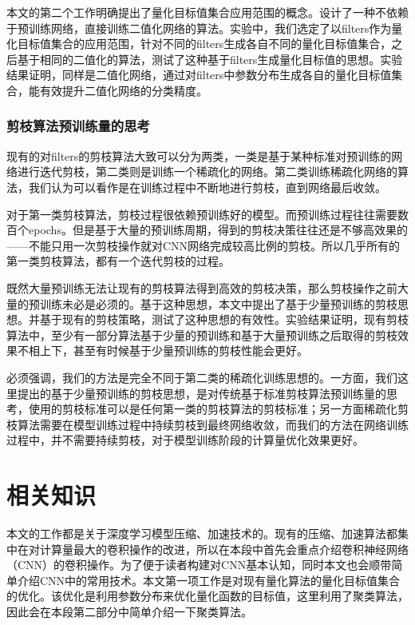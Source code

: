\documentclass[ pdftex, oneside, master]{NJUthesis}
\begin{document}
本文的第二个工作明确提出了量化目标值集合应用范围的概念。设计了一种不依赖于预训练网络，直接训练二值化网络的算法。实验中，我们选定了以filters作为量化目标值集合的应用范围，针对不同的filters生成各自不同的量化目标值集合，之后基于相同的二值化的算法，测试了这种基于filters生成量化目标值的思想。实验结果证明，同样是二值化网络，通过对filters中参数分布生成各自的量化目标值集合，能有效提升二值化网络的分类精度。

\subsection{剪枝算法预训练量的思考}

现有的对filters的剪枝算法大致可以分为两类，一类是基于某种标准对预训练的网络进行迭代剪枝，第二类则是训练一个稀疏化的网络。第二类训练稀疏化网络的算法，我们认为可以看作是在训练过程中不断地进行剪枝，直到网络最后收敛。

对于第一类剪枝算法，剪枝过程很依赖预训练好的模型。而预训练过程往往需要数百个epochs。但是基于大量的预训练周期，得到的剪枝决策往往还是不够高效果的——不能只用一次剪枝操作就对CNN网络完成较高比例的剪枝。所以几乎所有的第一类剪枝算法，都有一个迭代剪枝的过程。

既然大量预训练无法让现有的剪枝算法得到高效的剪枝决策，那么剪枝操作之前大量的预训练未必是必须的。基于这种思想，本文中提出了基于少量预训练的剪枝思想。并基于现有的剪枝策略，测试了这种思想的有效性。实验结果证明，现有剪枝算法中，至少有一部分算法基于少量的预训练和基于大量预训练之后取得的剪枝效果不相上下，甚至有时候基于少量预训练的剪枝性能会更好。

必须强调，我们的方法是完全不同于第二类的稀疏化训练思想的。一方面，我们这里提出的基于少量预训练的剪枝思想，是对传统基于标准剪枝算法预训练量的思考，使用的剪枝标准可以是任何第一类的剪枝算法的剪枝标准；另一方面稀疏化剪枝算法需要在模型训练过程中持续剪枝到最终网络收敛，而我们的方法在网络训练过程中，并不需要持续剪枝，对于模型训练阶段的计算量优化效果更好。


\chapter{相关知识}
本文的工作都是关于深度学习模型压缩、加速技术的。现有的压缩、加速算法都集中在对计算量最大的卷积操作的改进，所以在本段中首先会重点介绍卷积神经网络（CNN）的卷积操作。为了便于读者构建对CNN基本认知，同时本文也会顺带简单介绍CNN中的常用技术。本文第一项工作是对现有量化算法的量化目标值集合的优化。该优化是利用参数分布来优化量化函数的目标值，这里利用了聚类算法，因此会在本段第二部分中简单介绍一下聚类算法。
\end{document}
